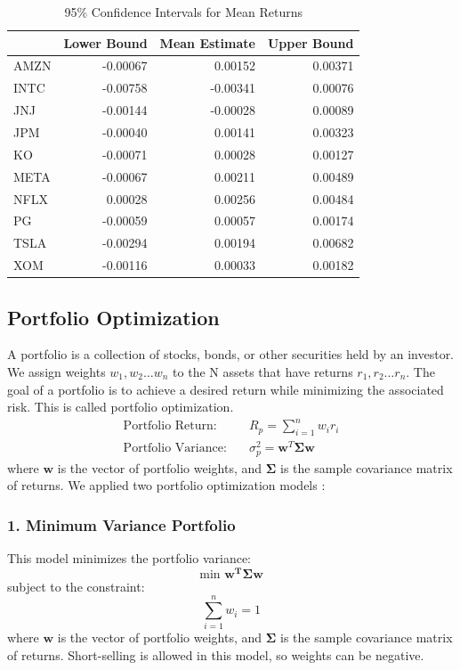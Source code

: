 \documentclass[11pt]{article}
\begin{document}
\begin{table}[htbp]
\centering
\begin{tabular}{lrrr}
\hline
 & Lower Bound & Mean Estimate & Upper Bound \\
\hline
AMZN & -0.00067 & 0.00152 & 0.00371 \\
INTC & -0.00758 & -0.00341 & 0.00076 \\
JNJ & -0.00144 & -0.00028 & 0.00089 \\
JPM & -0.00040 & 0.00141 & 0.00323 \\
KO & -0.00071 & 0.00028 & 0.00127 \\
META & -0.00067 & 0.00211 & 0.00489 \\
NFLX & 0.00028 & 0.00256 & 0.00484 \\
PG & -0.00059 & 0.00057 & 0.00174 \\
TSLA & -0.00294 & 0.00194 & 0.00682 \\
XOM & -0.00116 & 0.00033 & 0.00182 \\
\hline
\end{tabular}
\caption{95\% Confidence Intervals for Mean Returns}
\label{tab:confidence_intervals}
\end{table}

\subsection*{Portfolio Optimization}
A portfolio is a collection of stocks, bonds, or other securities held by an investor. We assign weights $w_1, w_2 \dots w_n$ to the N assets that have returns $r_1, r_2 \dots r_n$. The goal of a portfolio is to achieve a desired return while minimizing the associated risk. This is called portfolio optimization. 
\[
\begin{aligned}
\text{Portfolio Return:} \quad & R_p = \sum_{i=1}^{n} w_i r_i \\
\text{Portfolio Variance:} \quad & \sigma_p^2 = \mathbf{w}^T \mathbf{\Sigma} \mathbf{w}
\end{aligned}
\]
where $\mathbf{w}$ is the vector of portfolio weights, and $\mathbf{\Sigma}$ is the sample covariance matrix of returns. We applied two portfolio optimization models :

\subsubsection*{1. Minimum Variance Portfolio}
This model minimizes the portfolio variance:
\[\text{min } \mathbf{w^T\Sigma w}\]
subject to the constraint:
\[\sum_{i=1}^n w_i=1\]
where $\mathbf{w}$ is the vector of portfolio weights, and $\mathbf{\Sigma}$ is the sample covariance matrix of returns. Short-selling is allowed in this model, so weights can be negative.
\end{document}
